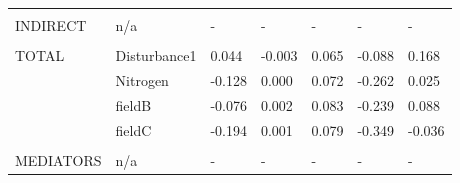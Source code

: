 \begin{longtable}[c]{l l l l l l l }
 & & & & & & \\
 INDIRECT & n/a & - & - & - & - & -\\
 & & & & & & \\
 TOTAL & Disturbance1 & 0.044 & -0.003 & 0.065 & -0.088 & 0.168\\
 & Nitrogen & -0.128 & 0.000 & 0.072 & -0.262 & 0.025\\
 & fieldB & -0.076 & 0.002 & 0.083 & -0.239 & 0.088\\
 & fieldC & -0.194 & 0.001 & 0.079 & -0.349 & -0.036\\
 & & & & & & \\
 MEDIATORS &n/a & - & - & - & - & -\\
\end{longtable}
